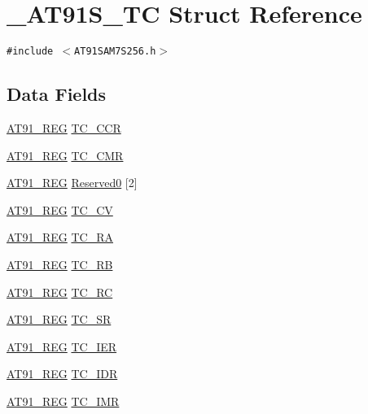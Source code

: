 \hypertarget{struct__AT91S__TC}{
\section{\_\-AT91S\_\-TC Struct Reference}
\label{struct__AT91S__TC}
}
{\tt \#include $<$AT91SAM7S256.h$>$}

\subsection*{Data Fields}
\begin{CompactItemize}
\item 
\hyperlink{AT91SAM7X256_8h_712ad5a1ac1bd02f3e95a7526c283ce1}{AT91\_\-REG} \hyperlink{struct__AT91S__TC_a6bd25995b743fce28cad60014bcc19d}{TC\_\-CCR}
\item 
\hyperlink{AT91SAM7X256_8h_712ad5a1ac1bd02f3e95a7526c283ce1}{AT91\_\-REG} \hyperlink{struct__AT91S__TC_8f785d881b6e0a859187ca8cfb3f1b9c}{TC\_\-CMR}
\item 
\hyperlink{AT91SAM7X256_8h_712ad5a1ac1bd02f3e95a7526c283ce1}{AT91\_\-REG} \hyperlink{struct__AT91S__TC_f1ae45e2103e19f10fde08c2476de94e}{Reserved0} \mbox{[}2\mbox{]}
\item 
\hyperlink{AT91SAM7X256_8h_712ad5a1ac1bd02f3e95a7526c283ce1}{AT91\_\-REG} \hyperlink{struct__AT91S__TC_c5fda5dfb1c8d684760677f9531e4707}{TC\_\-CV}
\item 
\hyperlink{AT91SAM7X256_8h_712ad5a1ac1bd02f3e95a7526c283ce1}{AT91\_\-REG} \hyperlink{struct__AT91S__TC_1a5a8c31c01b731a58c17dbd315c693a}{TC\_\-RA}
\item 
\hyperlink{AT91SAM7X256_8h_712ad5a1ac1bd02f3e95a7526c283ce1}{AT91\_\-REG} \hyperlink{struct__AT91S__TC_0ae10f9a6d3695b17618f62d254c2f20}{TC\_\-RB}
\item 
\hyperlink{AT91SAM7X256_8h_712ad5a1ac1bd02f3e95a7526c283ce1}{AT91\_\-REG} \hyperlink{struct__AT91S__TC_df8a3862cc1c6e10f09b682e36dcac2a}{TC\_\-RC}
\item 
\hyperlink{AT91SAM7X256_8h_712ad5a1ac1bd02f3e95a7526c283ce1}{AT91\_\-REG} \hyperlink{struct__AT91S__TC_530883d094b52082a5d1fdd12e143eb2}{TC\_\-SR}
\item 
\hyperlink{AT91SAM7X256_8h_712ad5a1ac1bd02f3e95a7526c283ce1}{AT91\_\-REG} \hyperlink{struct__AT91S__TC_208e358e5e40be90d09f42cf90683b19}{TC\_\-IER}
\item 
\hyperlink{AT91SAM7X256_8h_712ad5a1ac1bd02f3e95a7526c283ce1}{AT91\_\-REG} \hyperlink{struct__AT91S__TC_72c562420749d9b31f6b6eb9e76af529}{TC\_\-IDR}
\item 
\hyperlink{AT91SAM7X256_8h_712ad5a1ac1bd02f3e95a7526c283ce1}{AT91\_\-REG} \hyperlink{struct__AT91S__TC_275722ebb6d9b4d171f09cc1399fdd19}{TC\_\-IMR}
\end{CompactItemize}


